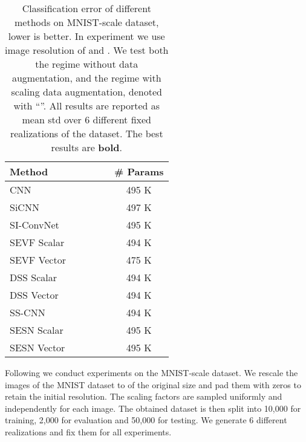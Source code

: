 \documentclass{article} \usepackage{multirow}
\begin{document}
\begin{table}[t]
    \begin{center}
    \begin{tabular}{l|ccccc}
        \toprule
        Method      &      &   &      &   & \# Params \\ 
        \midrule
        CNN         &       &       &       &       & 495 K     \\
        SiCNN       &       &       &       &       & 497 K     \\
        SI-ConvNet  &       &       &       &       & 495 K     \\
        SEVF Scalar &       &       &       &       & 494 K     \\
        SEVF Vector &       &       &       &       & 475 K     \\
        DSS Scalar  &       &       &       &       & 494 K     \\
        DSS Vector  &       &       &       &       & 494 K     \\
        SS-CNN      &       &       &       &       & 494 K     \\ 
        \midrule
        SESN Scalar &  &       &       &       & 495 K     \\
        SESN Vector &  &  &  &  & 495 K     \\
        \bottomrule  

    \end{tabular}
    \end{center}
    \caption{Classification error of different methods on MNIST-scale dataset, lower is better. 
    In experiment we use image resolution of  and . 
    We test both the regime without data augmentation, and the regime with scaling data augmentation, denoted with ``''. 
    All results are reported as mean  std over 6 different fixed realizations of the dataset.
    The best results are \textbf{bold}.}
    \label{tab:mnist_scale_results}
\end{table}

Following \citet{kanazawa2014locally,marcos2018scale,ghosh2019scale} 
we conduct experiments on the MNIST-scale dataset. 
We rescale the images of the MNIST dataset \citet{lecun1998gradient}
to  of the original size and pad them with zeros to retain the initial resolution. 
The scaling factors are sampled uniformly and independently for each image. 
The obtained dataset is then split into 10,000 for training,
2,000 for evaluation and 50,000 for testing. 
We generate 6 different realizations and fix them for all experiments.
\end{document}
